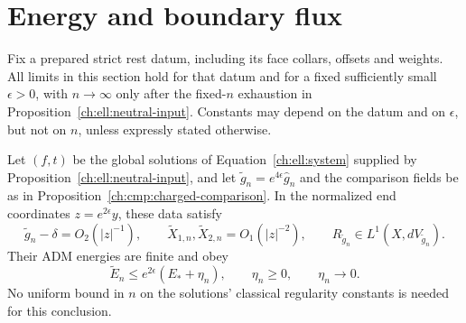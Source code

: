 \section{Energy and boundary flux}\label{ch:mass:section}

Fix a prepared strict rest datum, including its face collars, offsets and
weights.  All limits in this section hold for that datum and for a fixed
sufficiently small $\epsilon>0$, with $n\to\infty$ only after the
fixed-$n$ exhaustion in Proposition~\ref{ch:ell:neutral-input}.
Constants may depend on the datum and on $\epsilon$, but not on $n$,
unless expressly stated otherwise.

\begin{proposition}\label{ch:mass:comparison-energy}
Let $(f,t)$ be the global solutions of Equation~\eqref{ch:ell:system} supplied
by Proposition~\ref{ch:ell:neutral-input}, and let
$\widetilde g_n=e^{4\epsilon}\hat g_n$ and the comparison fields be as in
Proposition~\ref{ch:cmp:charged-comparison}.  In the normalized end coordinates
$z=e^{2\epsilon}y$, these data satisfy
\[
 \widetilde g_n-\delta=O_2(|z|^{-1}),\qquad
 \widetilde X_{1,n},\widetilde X_{2,n}=O_1(|z|^{-2}),\qquad
 R_{\widetilde g_n}\in L^1(X,dV_{\widetilde g_n}).
\]
Their ADM energies are finite and obey
\begin{equation}\label{ch:mass:energy-bound}
 \widetilde E_n\le e^{2\epsilon}(E_*+\eta_n),
 \qquad \eta_n\ge0,\qquad \eta_n\longrightarrow0.
\end{equation}
No uniform bound in $n$ on the solutions' classical regularity constants
is needed for this conclusion.
\end{proposition}

